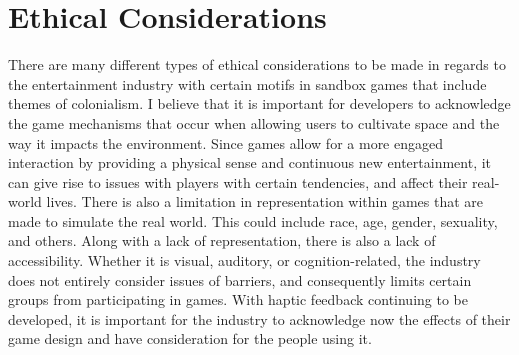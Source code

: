 \documentclass[10pt,twocolumn]{article}
\begin{document}
\section{Ethical Considerations}
There are many different types of ethical considerations to be made in regards to the entertainment industry with certain motifs in sandbox games that include themes of colonialism. I believe that it is important for developers to acknowledge the game mechanisms that occur when allowing users to cultivate space and the way it impacts the environment. Since games allow for a more engaged interaction by providing a physical sense and continuous new entertainment, it can give rise to issues with players with certain tendencies, and affect their real-world lives. There is also a limitation in representation within games that are made to simulate the real world. This could include race, age, gender, sexuality, and others. Along with a lack of representation, there is also a lack of accessibility. Whether it is visual, auditory, or cognition-related, the industry does not entirely consider issues of barriers, and consequently limits certain groups from participating in games. With haptic feedback continuing to be developed, it is important for the industry to acknowledge now the effects of their game design and have consideration for the people using it.
\end{document}
